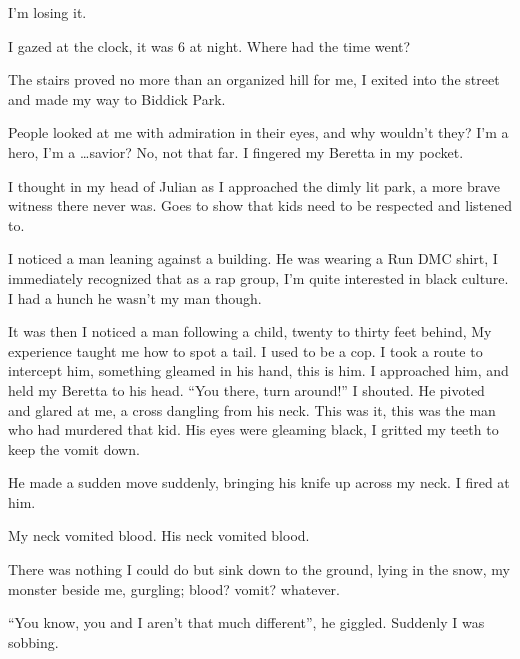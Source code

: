 I'm losing it.



I gazed at the clock, it was 6 at night. Where had the time
went?



The stairs proved no more than an organized hill for me, I exited
into the street and made my way to Biddick Park.



People looked at me with admiration in their eyes, and why wouldn't
they? I'm a hero, I'm a {\ldots}savior? No, not that far. I fingered my
Beretta in my pocket.



I thought in my head of Julian as I approached the dimly lit park,
a more brave witness there never was. Goes to show that kids need
to be respected and listened to.



I noticed a man leaning against a building. He was wearing a Run
DMC shirt, I immediately recognized that as a rap group, I'm quite
interested in black culture. I had a hunch he wasn't my man
though.



It was then I noticed a man following a child, twenty to thirty
feet behind, My experience taught me how to spot a tail. I used to
be a cop. I took a route to intercept him, something gleamed in his
hand, this is him. I approached him, and held my Beretta to his
head. ``You there, turn around!'' I shouted. He pivoted and glared at
me, a cross dangling from his neck. This was it, this was the man
who had murdered that kid. His eyes were gleaming black, I gritted
my teeth to keep the vomit down.



He made a sudden move suddenly, bringing his knife up across my
neck. I fired at him.



My neck vomited blood. His neck vomited blood.



There was nothing I could do but sink down to the ground, lying in
the snow, my monster beside me, gurgling; blood? vomit?
whatever.



``You know, you and I aren't that much different'', he giggled.
Suddenly I was sobbing. 
 





